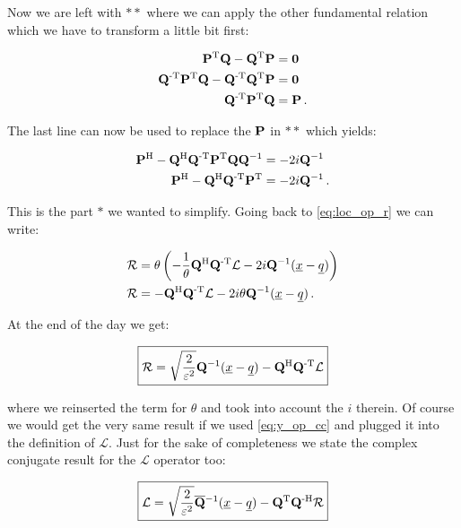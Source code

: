 Now we are left with $**$ where we can apply the other fundamental relation which
we have to transform a little bit first:

\begin{align*}
  \mathbf{P}{}^{\textnormal{T}} \mathbf{Q} - \mathbf{Q}{}^{\textnormal{T}} \mathbf{P} & = \mathbf{0} \\
  \mathbf{Q}{}^{\textnormal{-T}} \mathbf{P}{}^{\textnormal{T}} \mathbf{Q} - \mathbf{Q}{}^{\textnormal{-T}} \mathbf{Q}{}^{\textnormal{T}} \mathbf{P} & = \mathbf{0} \\
  \mathbf{Q}{}^{\textnormal{-T}} \mathbf{P}{}^{\textnormal{T}} \mathbf{Q} & = \mathbf{P} \,.
\end{align*}

The last line can now be used to replace the $\mathbf{P}$ in $**$ which yields:

\begin{align*}
  \mathbf{P}{}^{\textnormal{H}} - \mathbf{Q}{}^{\textnormal{H}} \mathbf{Q}{}^{\textnormal{-T}} \mathbf{P}{}^{\textnormal{T}} \mathbf{Q} \mathbf{Q}{}^{-1} & = -2i \mathbf{Q}{}^{-1} \\
  \mathbf{P}{}^{\textnormal{H}} - \mathbf{Q}{}^{\textnormal{H}} \mathbf{Q}{}^{\textnormal{-T}} \mathbf{P}{}^{\textnormal{T}} & = -2i \mathbf{Q}{}^{-1} \,.
\end{align*}

This is the part $*$ we wanted to simplify. Going back to \eqref{eq:loc_op_r}
we can write:

\begin{align*}
  \mathcal{R} & = \theta \left(
                    - \frac{1}{\theta} \mathbf{Q}{}^{\textnormal{H}}\mathbf{Q}{}^{\textnormal{-T}} \mathcal{L}
                    -2i \mathbf{Q}{}^{-1} (\underline{x}-\underline{q})
                  \right) \\
  \mathcal{R} & = - \mathbf{Q}{}^{\textnormal{H}}\mathbf{Q}{}^{\textnormal{-T}} \mathcal{L}
                    -2i \theta \mathbf{Q}{}^{-1} (\underline{x}-\underline{q}) \,.
\end{align*}

At the end of the day we get:

\begin{equation} \label{eq:r_op_wo_deriv}
  \boxed{
    \mathcal{R} = \sqrt{\frac{2}{\varepsilon^2}} \mathbf{Q}{}^{-1} (\underline{x}-\underline{q}) - \mathbf{Q}{}^{\textnormal{H}}\mathbf{Q}{}^{\textnormal{-T}} \mathcal{L}
  }
\end{equation}

where we reinserted the term for $\theta$ and took into account the $i$ therein.
Of course we would get the very same result if we used \eqref{eq:y_op_cc} and
plugged it into the definition of $\mathcal{L}$. Just for the sake of completeness
we state the complex conjugate result for the $\mathcal{L}$ operator too:

\begin{equation}
  \boxed{
    \mathcal{L} = \sqrt{\frac{2}{\varepsilon^2}} \mathbf{\overline{Q}}{}^{-1} (\underline{x}-\underline{q}) - \mathbf{Q}{}^{\textnormal{T}}\mathbf{Q}{}^{\textnormal{-H}} \mathcal{R}
  }
\end{equation}

